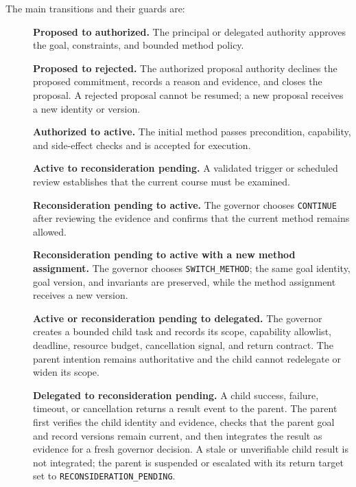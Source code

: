 
The main transitions and their guards are:

\begin{description}
  \item[] \textbf{Proposed to authorized.} The principal or delegated authority approves the goal, constraints, and bounded method policy.
  \item[] \textbf{Proposed to rejected.} The authorized proposal authority declines the proposed commitment, records a reason and evidence, and closes the proposal. A rejected proposal cannot be resumed; a new proposal receives a new identity or version.
  \item[] \textbf{Authorized to active.} The initial method passes precondition, capability, and side-effect checks and is accepted for execution.
  \item[] \textbf{Active to reconsideration pending.} A validated trigger or scheduled review establishes that the current course must be examined.
  \item[] \textbf{Reconsideration pending to active.} The governor chooses \texttt{CONTINUE} after reviewing the evidence and confirms that the current method remains allowed.
  \item[] \textbf{Reconsideration pending to active with a new method assignment.} The governor chooses \texttt{SWITCH\_METHOD}; the same goal identity, goal version, and invariants are preserved, while the method assignment receives a new version.
  \item[] \textbf{Active or reconsideration pending to delegated.} The governor creates a bounded child task and records its scope, capability allowlist, deadline, resource budget, cancellation signal, and return contract. The parent intention remains authoritative and the child cannot redelegate or widen its scope.
  \item[] \textbf{Delegated to reconsideration pending.} A child success, failure, timeout, or cancellation returns a result event to the parent. The parent first verifies the child identity and evidence, checks that the parent goal and record versions remain current, and then integrates the result as evidence for a fresh governor decision. A stale or unverifiable child result is not integrated; the parent is suspended or escalated with its return target set to \texttt{RECONSIDERATION\_PENDING}.

\end{description}
